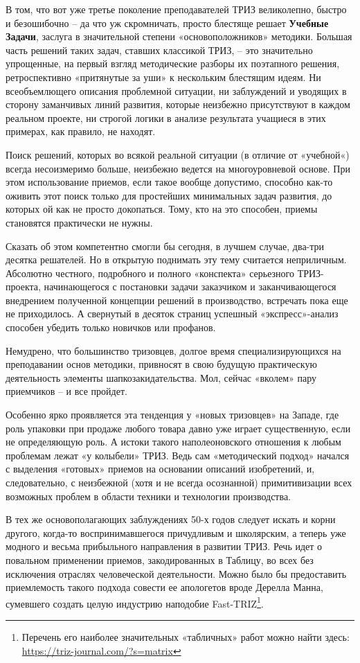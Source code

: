 \documentclass[11pt,a4paper]{article}
\begin{document}
В том, что вот уже третье поколение преподавателей ТРИЗ великолепно, быстро и
безошибочно -- да что уж скромничать, просто блестяще решает \textbf{Учебные
  Задачи}, заслуга в значительной степени «основоположников» методики. Большая
часть решений таких задач, ставших классикой ТРИЗ, -- это значительно
упрощенные, на первый взгляд методические разборы их поэтапного решения,
ретроспективно «притянутые за уши» к нескольким блестящим идеям. Ни
всеобъемлющего описания проблемной ситуации, ни заблуждений и уводящих в
сторону заманчивых линий развития, которые неизбежно присутствуют в каждом
реальном проекте, ни строгой логики в анализе результата учащиеся в этих
примерах, как правило, не находят.

Поиск решений, которых во всякой реальной ситуации (в отличие от «учебной«)
всегда несоизмеримо больше, неизбежно ведется на многоуровневой основе. При
этом использование приемов, если такое вообще допустимо, способно как-то
оживить этот поиск только для простейших минимальных задач развития, до
которых ой как не просто докопаться. Тому, кто на это способен, приемы
становятся практически не нужны.

Сказать об этом компетентно смогли бы сегодня, в лучшем случае, два-три
десятка решателей. Но в открытую поднимать эту тему считается неприличным.
Абсолютно честного, подробного и полного «конспекта» серьезного ТРИЗ-проекта,
начинающегося с постановки задачи заказчиком и заканчивающегося внедрением
полученной концепции решений в производство, встречать пока еще не
приходилось. А свернутый в десяток страниц успешный «экспресс»-анализ способен
убедить только новичков или профанов.

Немудрено, что большинство тризовцев, долгое время специализирующихся на
преподавании основ методики, привносят в свою будущую практическую
деятельность элементы шапкозакидательства. Мол, сейчас «вколем» пару
приемчиков -- и все пройдет.

Особенно ярко проявляется эта тенденция у «новых тризовцев» на Западе, где
роль упаковки при продаже любого товара давно уже играет существенную, если не
определяющую роль. А истоки такого наполеоновского отношения к любым проблемам
лежат «у колыбели» ТРИЗ. Ведь сам «методический подход» начался с выделения
«готовых» приемов на основании описаний изобретений, и, следовательно, с
неизбежной (хотя и не всегда осознанной) примитивизации всех возможных проблем
в области техники и технологии производства.

В тех же основополагающих заблуждениях 50-х годов следует искать и корни
другого, когда-то воспринимавшегося причудливым и школярским, а теперь уже
модного и весьма прибыльного направления в развитии ТРИЗ. Речь идет о
повальном применении приемов, закодированных в Таблицу, во всех без исключения
отраслях человеческой деятельности. Можно было бы предоставить приемлемость
такого подхода совести ее апологетов вроде Дерелла Манна, сумевшего создать
целую индустрию наподобие Fast-TRIZ\footnote{Перечень его наиболее
  значительных «табличных» работ можно найти здесь:
  \url{https://triz-journal.com/?s=matrix}}.
\end{document}
